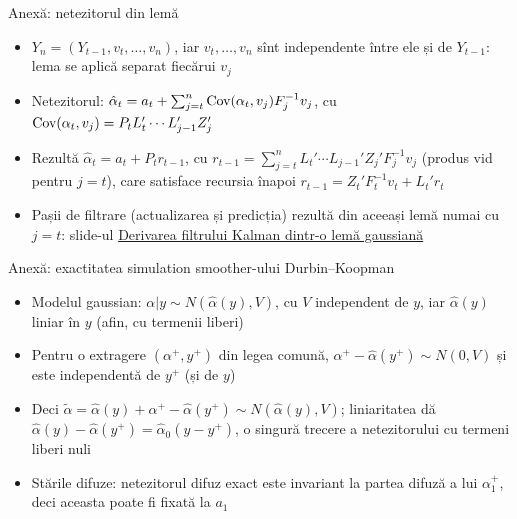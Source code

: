 \begin{frame}{Anexă: netezitorul din lemă}
\hypertarget{atsapp1}{}
\itemsize{\small}
\begin{itemize}
    \item $Y_n = (Y_{t-1}, v_t, \dots, v_n)$, iar $v_t, \dots, v_n$ sînt independente între ele și de $Y_{t-1}$: lema se aplică separat fiecărui $v_j$
    \item Netezitorul: $\hat\alpha_t = a_t + \sum_{j=t}^n\text{Cov}(\alpha_t, v_j)F_j^{-1}v_j$, cu $\text{Cov}(\alpha_t, v_j) = P_tL_t'\cdots L_{j-1}'Z_j'$
    \item Rezultă $\hat\alpha_t = a_t + P_tr_{t-1}$, cu $r_{t-1} = \sum_{j=t}^nL_t'\cdots L_{j-1}'Z_j'F_j^{-1}v_j$ (produs vid pentru $j = t$), care satisface recursia înapoi $r_{t-1} = Z_t'F_t^{-1}v_t + L_t'r_t$
    \item Pașii de filtrare (actualizarea și predicția) rezultă din aceeași lemă numai cu $j = t$: slide-ul \hyperlink{kflemma}{\textcolor{MainBlue}{Derivarea filtrului Kalman dintr-o lemă gaussiană}}
\end{itemize}
\end{frame}

\begin{frame}{Anexă: exactitatea simulation smoother-ului Durbin--Koopman}
\hypertarget{atsapp2}{}
\itemsize{\small}
\begin{itemize}
    \item Modelul gaussian: $\alpha | y \sim N(\hat\alpha(y), V)$, cu $V$ independent de $y$, iar $\hat\alpha(y)$ liniar în $y$ (afin, cu termenii liberi)
    \item Pentru o extragere $(\alpha^+, y^+)$ din legea comună, $\alpha^+ - \hat\alpha(y^+) \sim N(0, V)$ și este independentă de $y^+$ (și de $y$)
    \item Deci $\tilde\alpha = \hat\alpha(y) + \alpha^+ - \hat\alpha(y^+) \sim N(\hat\alpha(y), V)$; liniaritatea dă $\hat\alpha(y) - \hat\alpha(y^+) = \hat\alpha_0(y - y^+)$, o singură trecere a netezitorului cu termeni liberi nuli
    \item Stările difuze: netezitorul difuz exact este invariant la partea difuză a lui $\alpha_1^+$, deci aceasta poate fi fixată la $a_1$
\end{itemize}
\end{frame}

